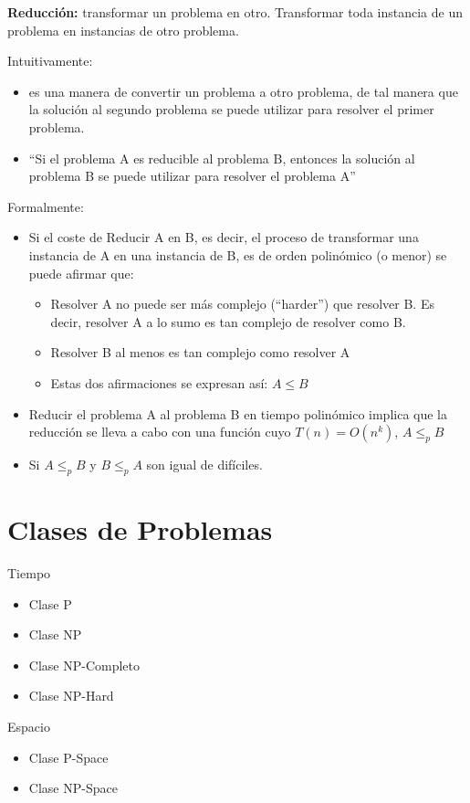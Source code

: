 \textbf{Reducción:} transformar un problema en otro. Transformar toda instancia de un problema en instancias de otro problema.

Intuitivamente:
\begin{itemize}
	\item es una manera de convertir un problema a otro problema, de tal manera que la solución al segundo problema se puede utilizar para resolver el primer problema.
	\item \enquote{Si el problema A es reducible al problema B, entonces la solución al problema B se
		      puede utilizar para resolver el problema A}
\end{itemize}

Formalmente:
\begin{itemize}
	\item Si el coste de Reducir A en B, es decir, el proceso de transformar una instancia de A en una instancia de B, es de orden polinómico (o menor) se puede afirmar que:
	      \begin{itemize}
		      \item Resolver A no puede ser más complejo (\enquote{harder}) que resolver B. Es decir, resolver A a lo sumo es tan complejo de resolver como B.
		      \item Resolver B al menos es tan complejo como resolver A
		      \item Estas dos afirmaciones se expresan así: $A \leq B$
	      \end{itemize}
	\item Reducir el problema A al problema B en tiempo polinómico implica que la reducción se lleva a cabo con una función cuyo $T(n)=O(n^k)$, $A \leq_p B$
	\item Si $A \leq_p B$ y $B \leq_p A$ son igual de difíciles.
\end{itemize}

\section{Clases de Problemas}
Tiempo
\begin{itemize}
	\item Clase P
	\item Clase NP
	\item Clase NP-Completo
	\item Clase NP-Hard
\end{itemize}

Espacio
\begin{itemize}
	\item Clase P-Space
	\item Clase NP-Space
\end{itemize}

